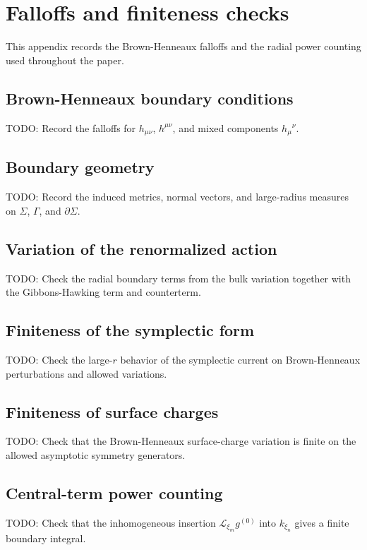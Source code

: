 \section{Falloffs and finiteness checks}\label{falloffs-and-finiteness-checks}

This appendix records the Brown-Henneaux falloffs and the radial power counting used throughout the paper.

\subsection{Brown-Henneaux boundary conditions}\label{brown-henneaux-boundary-conditions}

TODO: Record the falloffs for \(h_{\mu\nu}\), \(h^{\mu\nu}\), and mixed components \(h_\mu{}^\nu\).

\subsection{Boundary geometry}\label{boundary-geometry}

TODO: Record the induced metrics, normal vectors, and large-radius measures on \(\Sigma\), \(\Gamma\), and \(\partial\Sigma\).

\subsection{Variation of the renormalized action}\label{variation-of-the-renormalized-action}

TODO: Check the radial boundary terms from the bulk variation together with the Gibbons-Hawking term and counterterm.

\subsection{Finiteness of the symplectic form}\label{finiteness-of-the-symplectic-form}

TODO: Check the large-\(r\) behavior of the symplectic current on Brown-Henneaux perturbations and allowed variations.

\subsection{Finiteness of surface charges}\label{finiteness-of-surface-charges}

TODO: Check that the Brown-Henneaux surface-charge variation is finite on the allowed asymptotic symmetry generators.

\subsection{Central-term power counting}\label{central-term-power-counting}

TODO: Check that the inhomogeneous insertion \(\mathcal{L}_{\xi_m}g^{(0)}\) into \(k_{\xi_n}\) gives a finite boundary integral.
